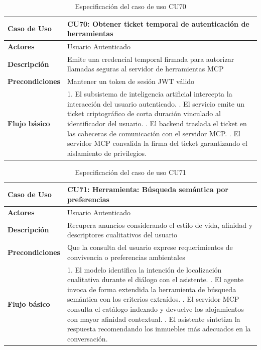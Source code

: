 \begin{table}[H]
\centering
\begin{tabular}{|p{3.2cm}|p{11.3cm}|}
\hline
\textbf{Caso de Uso} & \textbf{CU70: Obtener ticket temporal de autenticación de herramientas} \\ \hline
\textbf{Actores} & Usuario Autenticado \\ \hline
\textbf{Descripción} & Emite una credencial temporal firmada para autorizar llamadas seguras al servidor de herramientas MCP \\ \hline
\textbf{Precondiciones} & Mantener un token de sesión JWT válido \\ \hline
\textbf{Flujo básico} & 
1. El subsistema de inteligencia artificial intercepta la interacción del usuario autenticado. \newline
2. El servicio emite un ticket criptográfico de corta duración vinculado al identificador del usuario. \newline
3. El backend traslada el ticket en las cabeceras de comunicación con el servidor MCP. \newline
4. El servidor MCP convalida la firma del ticket garantizando el aislamiento de privilegios. \\ \hline
\end{tabular}
\caption{Especificación del caso de uso CU70}
\label{tab:cu70}
\end{table}

\begin{table}[H]
\centering
\begin{tabular}{|p{3.2cm}|p{11.3cm}|}
\hline
\textbf{Caso de Uso} & \textbf{CU71: Herramienta: Búsqueda semántica por preferencias} \\ \hline
\textbf{Actores} & Usuario Autenticado \\ \hline
\textbf{Descripción} & Recupera anuncios considerando el estilo de vida, afinidad y descriptores cualitativos del usuario \\ \hline
\textbf{Precondiciones} & Que la consulta del usuario exprese requerimientos de convivencia o preferencias ambientales \\ \hline
\textbf{Flujo básico} & 
1. El modelo identifica la intención de localización cualitativa durante el diálogo con el asistente. \newline
2. El agente invoca de forma extendida la herramienta de búsqueda semántica con los criterios extraídos. \newline
3. El servidor MCP consulta el catálogo indexado y devuelve los alojamientos con mayor afinidad contextual. \newline
4. El asistente sintetiza la respuesta recomendando los inmuebles más adecuados en la conversación. \\ \hline
\end{tabular}
\caption{Especificación del caso de uso CU71}
\label{tab:cu71}
\end{table}

